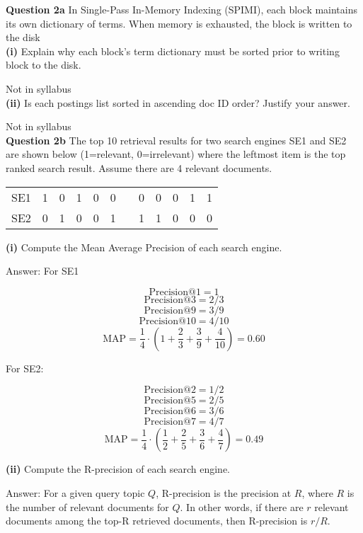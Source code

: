 \documentclass[11pt,a4paper]{report}
\begin{document}
\begin{multicols*}{2}
\noindent \textbf{Question 2a} In Single-Pass In-Memory Indexing (SPIMI), each block maintains its own dictionary of terms. When memory is exhausted, the block is written to the disk\\

\noindent \textbf{(i)} Explain why each block's term dictionary must be sorted prior to writing block to the disk.

\noindent Not in syllabus\\

\noindent \textbf{(ii)} Is each postings list sorted in ascending doc ID order? Justify your answer. 

\noindent Not in syllabus\\

\noindent \textbf{Question 2b} The top 10 retrieval results for two search engines SE1 and SE2 are shown below (1=relevant, 0=irrelevant) where the leftmost item is the top ranked search result. Assume there are 4 relevant documents.

\begin{center}
\begin{tabular}{ l l l l l l l l l l l l}
    SE1 & 1 & 0 & 1 & 0 & 0 &  & 0 & 0 & 0 & 1 & 1 \\
    SE2 & 0 & 1 & 0 & 0 & 1 &  & 1 & 1 & 0 & 0 & 0 \\
\end{tabular}
\end{center}

\noindent \textbf{(i)} Compute the Mean Average Precision of each search engine.

\noindent Answer: For SE1

$$\text{Precision@1}=1$$
$$\text{Precision@3}=2/3$$
$$\text{Precision@9}=3/9$$
$$\text{Precision@10}=4/10$$
$$\text{MAP} = \frac{1}{4} \cdot (1 + \frac{2}{3} + \frac{3}{9} + \frac{4}{10})= 0.60$$

\noindent For SE2:

$$\text{Precision@2}=1/2$$
$$\text{Precision@5}=2/5$$
$$\text{Precision@6}=3/6$$
$$\text{Precision@7}=4/7$$
$$\text{MAP} = \frac{1}{4} \cdot (\frac{1}{2} + \frac{2}{5} + \frac{3}{6} + \frac{4}{7}) = 0.49$$

\noindent \textbf{(ii)} Compute the R-precision of each search engine.

\noindent Answer: For a given query topic $Q$, R-precision is the precision at $R$, where $R$ is the number of relevant documents for $Q$. In other words, if there are $r$ relevant documents among the top-R retrieved documents, then R-precision is $r/R$.\\


\end{multicols*}
\end{document}
